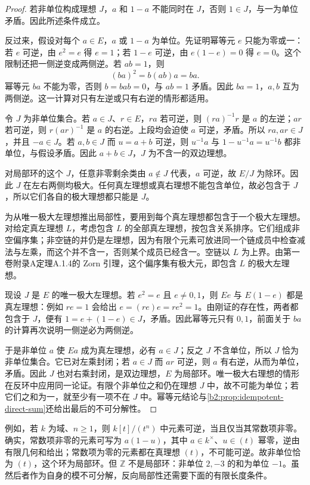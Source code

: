\begin{proof}
	若非单位构成理想 \(J\)，\(a\) 和 \(1-a\) 不能同时在 \(J\)，否则 \(1\in J\)，与一为单位矛盾。因此所述条件成立。

	反过来，假设对每个 \(a\in E\)，\(a\) 或 \(1-a\) 为单位。先证明幂等元 \(e\) 只能为零或一：若 \(e\) 可逆，由 \(e^2=e\) 得 \(e=1\)；若 \(1-e\) 可逆，由 \(e(1-e)=0\) 得 \(e=0\)。这个限制还把一侧逆变成两侧逆。若 \(ab=1\)，则
	\[
		(ba)^2=b(ab)a=ba.
	\]
	幂等元 \(ba\) 不能为零，否则 \(b=bab=0\)，与 \(ab=1\) 矛盾。因此 \(ba=1\)，\(a,b\) 互为两侧逆。这一计算对只有左逆或只有右逆的情形都适用。

	令 \(J\) 为非单位集合。若 \(a\in J\)、\(r\in E\)，\(ra\) 若可逆，则 \((ra)^{-1}r\) 是 \(a\) 的左逆；\(ar\) 若可逆，则 \(r(ar)^{-1}\) 是 \(a\) 的右逆。上段均会迫使 \(a\) 可逆，矛盾。所以 \(ra,ar\in J\)，并且 \(-a\in J\)。若 \(a,b\in J\) 而 \(u=a+b\) 可逆，则 \(u^{-1}a\) 与 \(1-u^{-1}a=u^{-1}b\) 都非单位，与假设矛盾。因此 \(a+b\in J\)，\(J\) 为不含一的双边理想。

	对局部环的这个 \(J\)，任意非零剩余类由 \(a\notin J\) 代表，\(a\) 可逆，故 \(E/J\) 为除环。因此 \(J\) 在左右两侧均极大。任何真左理想或真右理想不能包含单位，故必包含于 \(J\)，所以它们各自的极大理想都只能是 \(J\)。

	为从唯一极大左理想推出局部性，要用到每个真左理想都包含于一个极大左理想。对给定真左理想 \(L\)，考虑包含 \(L\) 的全部真左理想，按包含关系排序。它们组成非空偏序集；非空链的并仍是左理想，因为有限个元素可放进同一个链成员中检查减法与左乘，而这个并不含一，否则某个成员已经含一。空链以 \(L\) 为上界。由第一卷附录A定理A.1.4的 Zorn 引理，这个偏序集有极大元，即包含 \(L\) 的极大左理想。

	现设 \(J\) 是 \(E\) 的唯一极大左理想。若 \(e^2=e\) 且 \(e\ne0,1\)，则 \(Ee\) 与 \(E(1-e)\) 都是真左理想：例如 \(re=1\) 会给出 \(e=(re)e=r e^2=1\)。由刚证的存在性，两者都包含于 \(J\)，便有 \(1=e+(1-e)\in J\)，矛盾。因此幂等元只有 \(0,1\)，前面关于 \(ba\) 的计算再次说明一侧逆必为两侧逆。

	于是非单位 \(a\) 使 \(Ea\) 成为真左理想，必有 \(a\in J\)；反之 \(J\) 不含单位，所以 \(J\) 恰为非单位集合。它已对左乘封闭；若 \(a\in J\) 而 \(ar\) 可逆，则 \(a\) 有右逆，从而为单位，矛盾。因此 \(J\) 也对右乘封闭，是双边理想，\(E\) 为局部环。唯一极大右理想的情形在反环中应用同一论证。有限个非单位之和仍在理想 \(J\) 中，故不可能为单位；若它们之和为一，就至少有一项不在 \(J\) 中。幂等元结论与\cref{b2:prop:idempotent-direct-sum}还给出最后的不可分解性。
\end{proof}

例如，若 \(k\) 为域、\(n\ge1\)，则 \(k[t]/(t^n)\) 中元素可逆，当且仅当其常数项非零。确实，常数项非零的元素可写为 \(a(1-u)\)，其中 \(a\in k^\times\)、\(u\in(t)\) 幂零，逆由有限几何和给出；常数项为零的元素都在真理想 \((t)\)，不可能可逆。故非单位恰为 \((t)\)，这个环为局部环。但 \(\mathbb Z\) 不是局部环：非单位 \(2,-3\) 的和为单位 \(-1\)。虽然后者作为自身的模不可分解，反向局部性还需要下面的有限长度条件。


